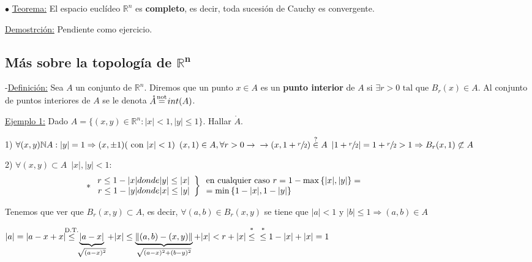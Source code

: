 \documentclass[12pt, titlepage]{article}
\newcommand{\eqc}[1]{\stackrel{\mathclap{\normalfont\mbox{\scriptsize{#1}}}}{=}}
\newcommand{\leqc}[1]{\stackrel{\mathclap{\normalfont\mbox{\scriptsize{#1}}}}{\leq}}
\newcommand{\inc}[1]{\stackrel{\mathclap{\normalfont\mbox{\scriptsize{#1}}}}{\in}}
\newcommand{\R}{\mathbb{R}}
\newcommand{\N}{\mathbb{N}}
\newcommand{\spac}{\, \, \,}
\begin{document}
\noindent $\bullet$ \underline{Teorema:} El espacio euclídeo $\R^n$ es \textbf{completo}, es decir, toda sucesión de Cauchy es convergente.
\vspace{2mm}

\underline{Demostrción:} Pendiente como ejercicio.
\vspace{5mm}

\subsection{Más sobre la topología de $\mathbf{\R^n}$}
\vspace{5mm}


-\underline{Definición:} Sea $A$ un conjunto de $\R^n$. Diremos que un punto $x \in A$  es un \textbf{punto interior} de $A$ si $\exists r > 0 \text{ tal que } B_r (x) \in A$. Al conjunto de puntos interiores de $A$ se le denota $\mathring{A} \eqc{not} int(A)$.
\vspace{3mm}

\underline{Ejemplo 1:} Dado $A = \{(x, y) \in \R^n : |x|<1, |y| \leq 1 \}$. Hallar $\mathring{A}$.
\vspace{3mm}

1) $\forall (x, y) \N A : |y| = 1 \Rightarrow (x, \pm 1) (\text{ con } |x| < 1) \spac (x, 1) \in A, \forall r > 0 \rightarrow \\ \rightarrow (x, 1 + \sfrac{r}{2}) \inc{?} A \spac |1 + \sfrac{r}{2}| = 1 + \sfrac{r}{2} > 1 \Rightarrow B_r(x, 1) \not \subset A$

2) $\forall (x, y) \subset A \spac |x|, |y| < 1$:
\[
*\left. \begin{array}{rc}

r \leq 1- |x| donde |y| \leq |x|\\
r \leq 1- |y| donde |x| \leq |y|

\end{array}\right \}\spac\parbox{10cm}{en cualquier caso $r = 1 - \max{\{|x|, |y|\}} = \\ =\min{\{1 - |x|,
 1 - |y|\}}$}
\]

Tenemos que ver que $B_r (x, y) \subset A$, es decir, $\forall (a, b) \in B_r(x, y)$ se tiene que $|a| < 1
 \text{ y } |b| \leq 1 \Rightarrow (a, b) \in A$

$|a| = |a - x + x| \leqc{D.T.} \underbrace{|a-x|}_{\sqrt{(a - x)^2}} + |x| \leq \underbrace{\|(a, b) - (x, y
)\|}_{\sqrt{(a -x)^2 + (b - y)^2}} + |x| < r + |x| \leqc{*} \\ \leqc{*} 1 - |x| +|x| =1$
\vspace{3mm}
\end{document}
